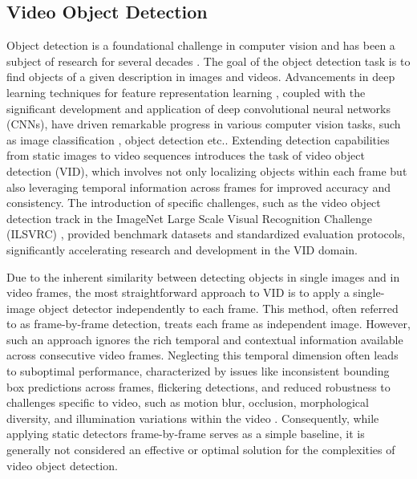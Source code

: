 \subsection{Video Object Detection} \label{Background:VideoObjectDetection}


Object detection is a foundational challenge in computer vision and has been a subject of research for several decades \cite{fischlerRepresentationMatchingPictorial1973}. The goal of the object detection task is to find objects of a given description in images and videos.
Advancements in deep learning techniques for feature representation learning \cite{hintonReducingDimensionalityData2006, lecunDeepLearning2015}, coupled with the significant development and application of deep convolutional neural networks (CNNs), have driven remarkable progress in various computer vision tasks, such as image classification \cite{krizhevskyImageNetClassificationDeep2012}, object detection \cite{girshickRichFeatureHierarchies2014a} etc..
Extending detection capabilities from static images to video sequences introduces the task of video object detection (VID), which involves not only localizing objects within each frame but also leveraging temporal information across frames for improved accuracy and consistency.
The introduction of specific challenges, such as the video object detection track in the ImageNet Large Scale Visual Recognition Challenge (ILSVRC) \cite{russakovskyImageNetLargeScale2015}, provided benchmark datasets and standardized evaluation protocols, significantly accelerating research and development in the VID domain.

Due to the inherent similarity between detecting objects in single images and in video frames, the most straightforward approach to VID is to apply a single-image object detector independently to each frame. 
This method, often referred to as frame-by-frame detection, treats each frame as independent image. %
However, such an approach ignores the rich temporal and contextual information available across consecutive video frames. Neglecting this temporal dimension often leads to suboptimal performance, characterized by issues like inconsistent bounding box predictions across frames, flickering detections, and reduced robustness to challenges specific to video, such as motion blur, occlusion, morphological diversity, and illumination variations within the video \cite{jiaoNewGenerationDeep2022}. 
Consequently, while applying static detectors frame-by-frame serves as a simple baseline, it is generally not considered an effective or optimal solution for the complexities of video object detection. %

